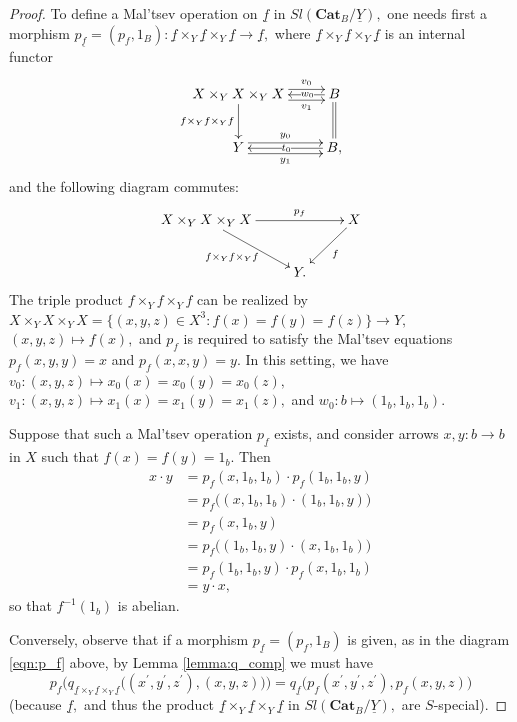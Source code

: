 \documentclass[11pt]{amsart}
\theoremstyle{plain}
\theoremstyle{definition}
\theoremstyle{remark}
\newcommand{\un}{\underline}
\begin{document}
\begin{proof}
To define a Mal'tsev operation on $\un{f}$ in $Sl(\mathbf{Cat}_B/\underline{Y}),$ one needs first a morphism $p_{\un{f}}=(p_f,1_B)\colon\un{f}\times_Y\un{f}\times_Y\un{f}\rightarrow\un{f},$ where $\un{f}\times_Y\un{f}\times_Y\un{f}$ is an internal functor
\begin{equation}
\begin{aligned}
\label{eqn:fxfxf}
\xymatrix{
{X \times_YX\times_Y X} \ar[d]_-{f\times_Yf\times_Yf} \ar@<.9ex>[r]^-{v_0} \ar@<-.9ex>[r]_-{v_1} &B \ar@{=}[d] \ar[l]|(.28){w_0} \\
Y \ar@<.9ex>[r]^-{y_0} \ar@<-.9ex>[r]_-{y_1} &{B,} \ar[l]|{t_0}
}
\end{aligned}
\end{equation}
and the following diagram commutes:
\begin{equation}
\begin{aligned}
\label{eqn:p_f}
\xymatrix{
{X \times_YX\times_Y X} \ar[rr]^-{p_f} \ar[rd]_-{f\times_Yf\times_Yf \ \ } &\ &X \ar[ld]^-f \\
&{Y.} &\
}
\end{aligned}
\end{equation}
The triple product $f\times_Yf\times_Yf$ can be realized by $X \times_YX\times_Y X=\{(x,y,z)\in X^3:f(x)=f(y)=f(z)\}\rightarrow Y,$ $(x,y,z)\mapsto f(x),$ and $p_f$ is required to satisfy the Mal'tsev equations $p_f(x,y,y)=x$ and $p_f(x,x,y)=y.$ In this setting, we have $v_0\colon(x,y,z)\mapsto x_0(x)=x_0(y)=x_0(z),$ $v_1\colon(x,y,z)\mapsto x_1(x)=x_1(y)=x_1(z),$ and $w_0\colon b\mapsto(1_b,1_b,1_b).$

Suppose that such a Mal'tsev operation $p_{\un{f}}$ exists, and consider arrows $x,y\colon b\rightarrow b$ in $X$ such that $f(x)=f(y)=1_b.$ Then
\begin{equation*}
\begin{split}
x\cdot y&=p_f(x,1_b,1_b)\cdot p_f(1_b,1_b,y)\\
&=p_f\big((x,1_b,1_b)\cdot(1_b,1_b,y)\big)\\
&=p_f(x,1_b,y)\\
&=p_f\big((1_b,1_b,y)\cdot(x,1_b,1_b)\big)\\
&=p_f(1_b,1_b,y)\cdot p_f(x,1_b,1_b)\\
&=y\cdot x,
\end{split}
\end{equation*}
so that $f^{-1}(1_b)$ is abelian.

Conversely, observe that if a morphism $p_{\un{f}}=(p_f,1_B)$ is given, as in the diagram \eqref{eqn:p_f} above, by Lemma \ref{lemma:q_comp} we must have
\begin{equation}
\label{eqn:quasi_q}
p_f\Big(q_{\un{f}\times_Y\un{f}\times_Y\un{f}}\big((x^\prime,y^\prime,z^\prime),(x,y,z)\big)\Big)=q_{\un{f}}\big(p_f(x^\prime,y^\prime,z^\prime),p_f(x,y,z)\big)
\end{equation}
(because $\un{f},$ and thus the product $\un{f}\times_Y\un{f}\times_Y\un{f}$ in $Sl(\mathbf{Cat}_B/\un{Y}),$ are $S$-special).


\end{proof}
\end{document}
